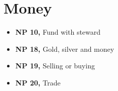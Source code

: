 \chapter{Money}

\begin{itemize}
\tightlist
\item
  \textbf{NP 10,} Fund with steward
\item
  \textbf{NP 18,} Gold, silver and money
\item
  \textbf{NP 19,} Selling or buying
\item
  \textbf{NP 20,} Trade
\end{itemize}


